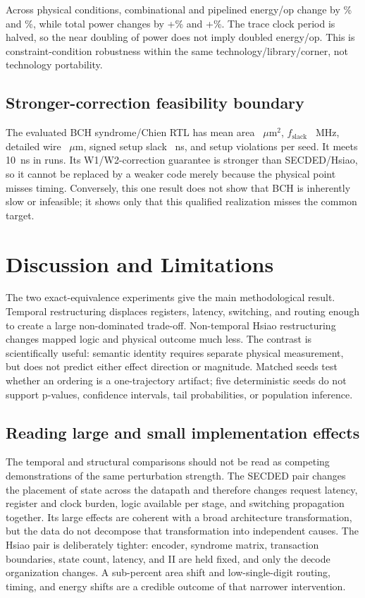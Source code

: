 \documentclass[conference,10pt]{IEEEtran}
\begin{document}
Across physical conditions, combinational and pipelined energy/op change by \CombConditionEnergy\% and \PipeConditionEnergy\%, while total power changes by +\CombConditionPower\% and +\PipeConditionPower\%. The trace clock period is halved, so the near doubling of power does not imply doubled energy/op. This is constraint-condition robustness within the same technology/library/corner, not technology portability.

\subsection{Stronger-correction feasibility boundary}

The evaluated BCH syndrome/Chien RTL has mean area \BchArea~$\mu$m$^2$, $f_{\mathrm{slack}}$ \BchFreq~MHz, detailed wire \BchWire~$\mu$m, signed setup slack \BchSlack~ns, and \BchSetupViolations{} setup violations per seed. It meets 10~ns in \BchFeasible{} runs. Its W1/W2-correction guarantee is stronger than SECDED/Hsiao, so it cannot be replaced by a weaker code merely because the physical point misses timing. Conversely, this one result does not show that BCH is inherently slow or infeasible; it shows only that this qualified realization misses the common target.

\section{Discussion and Limitations}

The two exact-equivalence experiments give the main methodological result. Temporal restructuring displaces registers, latency, switching, and routing enough to create a large non-dominated trade-off. Non-temporal Hsiao restructuring changes mapped logic and physical outcome much less. The contrast is scientifically useful: semantic identity requires separate physical measurement, but does not predict either effect direction or magnitude. Matched seeds test whether an ordering is a one-trajectory artifact; five deterministic seeds do not support p-values, confidence intervals, tail probabilities, or population inference.

\subsection{Reading large and small implementation effects}

The temporal and structural comparisons should not be read as competing demonstrations of the same perturbation strength. The SECDED pair changes the placement of state across the datapath and therefore changes request latency, register and clock burden, logic available per stage, and switching propagation together. Its large effects are coherent with a broad architecture transformation, but the data do not decompose that transformation into independent causes. The Hsiao pair is deliberately tighter: encoder, syndrome matrix, transaction boundaries, state count, latency, and II are held fixed, and only the decode organization changes. A sub-percent area shift and low-single-digit routing, timing, and energy shifts are a credible outcome of that narrower intervention.
\end{document}
